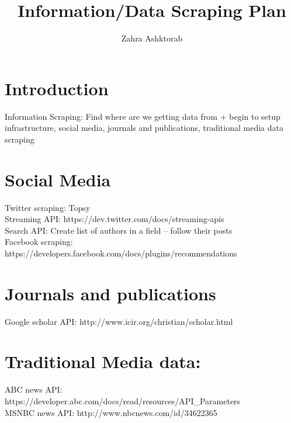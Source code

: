\documentclass{article}
\title{Information/Data Scraping Plan}
\author{Zahra Ashktorab}
\begin{document}
\maketitle

\section{Introduction}
Information Scraping: Find where are we getting data from + begin to setup infrastructure, social media, journals and publications, traditional media data scraping


\section{Social Media}
Twitter scraping: Topsy \\
Streaming API: https://dev.twitter.com/docs/streaming-apis \\
Search API: Create list of authors in a field – follow their posts \\
Facebook scraping: https://developers.facebook.com/docs/plugins/recommendations \\

\section{Journals and publications}
Google scholar API: http://www.icir.org/christian/scholar.html \\

\section{Traditional Media data:}
ABC news API: https://developer.abc.com/docs/read/resources/API_Parameters \\
MSNBC news API: http://www.nbcnews.com/id/34622365 \\
\end{document}
